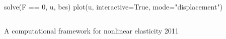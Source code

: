 \begin{frame}[fragile, shrink=50]
\begin{columns}
\begin{column}{0.5\textwidth}
\begin{python}
solve(F == 0, u, bcs) 
plot(u, interactive=True, mode="displacement")
      \end{python}
    \end{column}
  \end{columns}

  \huge

            {A computational framework for nonlinear elasticity}
            {2011}

\end{frame}
